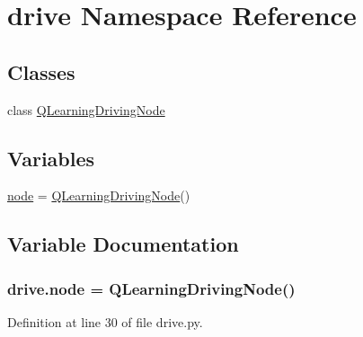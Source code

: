 \hypertarget{namespacedrive}{}\section{drive Namespace Reference}
\label{namespacedrive}
\subsection*{Classes}
\begin{DoxyCompactItemize}
\item 
class \hyperlink{classdrive_1_1_q_learning_driving_node}{Q\+Learning\+Driving\+Node}
\end{DoxyCompactItemize}
\subsection*{Variables}
\begin{DoxyCompactItemize}
\item 
\hyperlink{namespacedrive_a3118901ad129c1aa0fbf3907733dd38d}{node} = \hyperlink{classdrive_1_1_q_learning_driving_node}{Q\+Learning\+Driving\+Node}()
\end{DoxyCompactItemize}


\subsection{Variable Documentation}
\subsubsection[{\texorpdfstring{node}{node}}]{\setlength{\rightskip}{0pt plus 5cm}drive.\+node = {\bf Q\+Learning\+Driving\+Node}()}\hypertarget{namespacedrive_a3118901ad129c1aa0fbf3907733dd38d}{}\label{namespacedrive_a3118901ad129c1aa0fbf3907733dd38d}


Definition at line 30 of file drive.\+py.

